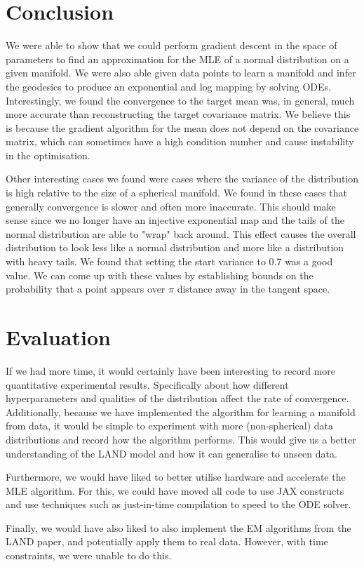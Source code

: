 \documentclass{article}
\begin{document}
\section{Conclusion}
We were able to show that we could perform gradient descent in the space of parameters to find an approximation for the MLE of a normal distribution on a given manifold.
We were also able given data points to learn a manifold and infer the geodesics to produce an exponential and log mapping by solving ODEs. Interestingly, we found the convergence to the target mean was, in general, much more accurate than reconstructing the target covariance matrix. We believe this is because the gradient algorithm for the mean does not depend on the covariance matrix, which can sometimes have a high condition number and cause instability in the optimisation.

Other interesting cases we found were cases where the variance of the distribution is high relative to the size of a spherical manifold.
We found in these cases that generally convergence is slower and often more inaccurate.
This should make sense since we no longer have an injective exponential map and the tails of the normal distribution are able to "wrap" back around.
This effect causes the overall distribution to look less like a normal distribution and more like a distribution with heavy tails.
We found that setting the start variance to 0.7 was a good value.
We can come up with these values by establishing bounds on the probability that a point appears over $\pi$ distance away in the tangent space.

\section{Evaluation}
If we had more time, it would certainly have been interesting to record more quantitative experimental results. Specifically about how different hyperparameters and qualities of the distribution affect the rate of convergence. Additionally, because we have implemented the algorithm for learning a manifold from data, it would be simple to experiment with more (non-spherical) data distributions and record how the algorithm performs. This would give us a better understanding of the LAND model and how it can generalise to unseen data.

Furthermore, we would have liked to better utilise hardware and accelerate the MLE algorithm. For this, we could have moved all code to use JAX constructs and use techniques such as just-in-time compilation to speed to the ODE solver. 

Finally, we would have also liked to also implement the EM algorithms from the LAND paper, and potentially apply them to real data. However, with time constraints, we were unable to do this.



\end{document}
